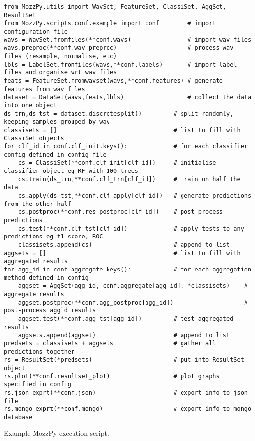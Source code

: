         \begin{listing}[ht]
            \begin{verbatim}
from MozzPy.utils import WavSet, FeatureSet, ClassiSet, AggSet, ResultSet   
from MozzPy.scripts.conf.example import conf        # import configuration file
wavs = WavSet.fromfiles(**conf.wavs)                # import wav files
wavs.preproc(**conf.wav_preproc)                    # process wav files (resample, normalise, etc)
lbls = LabelSet.fromfiles(wavs,**conf.labels)       # import label files and organise wrt wav files
feats = FeatureSet.fromwavset(wavs,**conf.features) # generate features from wav files
dataset = DataSet(wavs,feats,lbls)                  # collect the data into one object
ds_trn,ds_tst = dataset.discretesplit()         # split randomly, keeping samples grouped by wav
classisets = []                                 # list to fill with ClassiSet objects
for clf_id in conf.clf_init.keys():             # for each classifier config defined in config file
    cs = ClassiSet(**conf.clf_init[clf_id])     # initialise classifier object eg RF with 100 trees
    cs.train(ds_trn,**conf.clf_trn[clf_id])     # train on half the data
    cs.apply(ds_tst,**conf.clf_apply[clf_id])   # generate predictions from the other half
    cs.postproc(**conf.res_postproc[clf_id])    # post-process predictions
    cs.test(**conf.clf_tst[clf_id])             # apply tests to any predictions eg f1 score, ROC
    classisets.append(cs)                       # append to list
aggsets = []                                    # list to fill with aggregated results
for agg_id in conf.aggregate.keys():            # for each aggregation method defined in config
    aggset = AggSet(agg_id, conf.aggregate[agg_id], *classisets)    # aggregate results
    aggset.postproc(**conf.agg_postproc[agg_id])                    # post-process agg`d results
    aggset.test(**conf.agg_tst[agg_id])         # test aggregated results
    aggsets.append(aggset)                      # append to list
predsets = classisets + aggsets                 # gather all predictions together
rs = ResultSet(*predsets)                       # put into ResultSet object
rs.plot(**conf.resultset_plot)                  # plot graphs specified in config
rs.json_exprt(**conf.json)                      # export info to json file
rs.mongo_exprt(**conf.mongo)                    # export info to mongo database
            \end{verbatim}
            \caption{Example MozzPy execution script.}
            \label{code:pl-mozzpy-usage-exec}
        \end{listing} 
    
